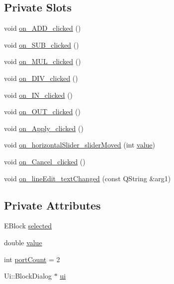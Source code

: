 \subsection*{Private Slots}
\begin{DoxyCompactItemize}
\item 
void \hyperlink{classBlockDialog_ad8f20cab9c17a9a03d846a10215c55c5}{on\+\_\+\+A\+D\+D\+\_\+clicked} ()
\item 
void \hyperlink{classBlockDialog_af9974e5eed00d8ed6541207152559639}{on\+\_\+\+S\+U\+B\+\_\+clicked} ()
\item 
void \hyperlink{classBlockDialog_a8d9ff3eb620ffcf02a184b7a5ca535ce}{on\+\_\+\+M\+U\+L\+\_\+clicked} ()
\item 
void \hyperlink{classBlockDialog_a01cf45f68a5b5b688916be2a8d78e7eb}{on\+\_\+\+D\+I\+V\+\_\+clicked} ()
\item 
void \hyperlink{classBlockDialog_aaa26399a715ce36bf46f9c4a7a3b834a}{on\+\_\+\+I\+N\+\_\+clicked} ()
\item 
void \hyperlink{classBlockDialog_ab5afbbd67eb4c1ee11191cad1da29630}{on\+\_\+\+O\+U\+T\+\_\+clicked} ()
\item 
void \hyperlink{classBlockDialog_a5e445ed193d3f7e2eba29e192f038221}{on\+\_\+\+Apply\+\_\+clicked} ()
\item 
void \hyperlink{classBlockDialog_a9c009de0d86bff7a265f3db598e204fc}{on\+\_\+horizontal\+Slider\+\_\+slider\+Moved} (int \hyperlink{classBlockDialog_ad0c5a84d24461a66fc604159306cd65c}{value})
\item 
void \hyperlink{classBlockDialog_a875bd7ee646be1c30b90f09d3666b4b1}{on\+\_\+\+Cancel\+\_\+clicked} ()
\item 
void \hyperlink{classBlockDialog_aadce9fabc644d0d73f36ddc3749c9975}{on\+\_\+line\+Edit\+\_\+text\+Changed} (const Q\+String \&arg1)
\end{DoxyCompactItemize}
\subsection*{Private Attributes}
\begin{DoxyCompactItemize}
\item 
E\+Block \hyperlink{classBlockDialog_a369bf9158760dcf32d7c98d7f4c3fd24}{selected}
\item 
double \hyperlink{classBlockDialog_ad0c5a84d24461a66fc604159306cd65c}{value}
\item 
int \hyperlink{classBlockDialog_a5d3f519ebe7794146a1f24607ab3066a}{port\+Count} = 2
\item 
Ui\+::\+Block\+Dialog $\ast$ \hyperlink{classBlockDialog_ad8e54f70336f615f84a19cf59b4bb420}{ui}
\end{DoxyCompactItemize}


